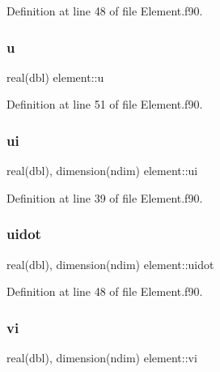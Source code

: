 Definition at line 48 of file Element.\+f90.

\mbox{\label{namespaceelement_a6d48ee96f674959ef1225a3730fcf3e7}} 
\subsubsection{\texorpdfstring{u}{u}}
{\footnotesize\ttfamily real(dbl) element\+::u\hspace{0.3cm}{\ttfamily [private]}}



Definition at line 51 of file Element.\+f90.

\mbox{\label{namespaceelement_ad1b3c2d05a1c131831f0d4eef43f9105}} 
\subsubsection{\texorpdfstring{ui}{ui}}
{\footnotesize\ttfamily real(dbl), dimension(ndim) element\+::ui\hspace{0.3cm}{\ttfamily [private]}}



Definition at line 39 of file Element.\+f90.

\mbox{\label{namespaceelement_a0ceabdb65183ba09653081ad8ca4259d}} 
\subsubsection{\texorpdfstring{uidot}{uidot}}
{\footnotesize\ttfamily real(dbl), dimension(ndim) element\+::uidot\hspace{0.3cm}{\ttfamily [private]}}



Definition at line 48 of file Element.\+f90.

\mbox{\label{namespaceelement_a7e7198874f6dd0702abdd8ba0dfc7c2d}} 
\subsubsection{\texorpdfstring{vi}{vi}}
{\footnotesize\ttfamily real(dbl), dimension(ndim) element\+::vi\hspace{0.3cm}{\ttfamily [private]}}



